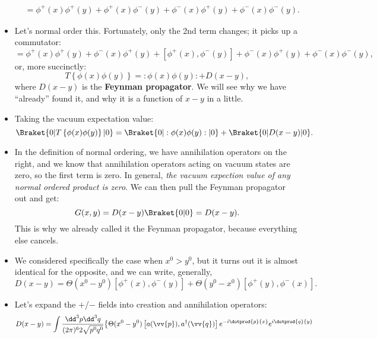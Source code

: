 \begin{itemize}
\begin{align*}
            &= \phi^+(x)\phi^+(y) + \phi^+(x)\phi^-(y) + \phi^-(x)\phi^+(y) + \phi^-(x)\phi^-(y).
        \end{align*}
    \item Let's normal order this. Fortunately, only the 2nd term changes; it picks up a commutator:
        \begin{equation*}
            = \phi^+(x)\phi^+(y) + \phi^-(x)\phi^+(y) + \left[ \phi^+(x),\phi^-(y) \right] + \phi^-(x)\phi^+(y) + \phi^-(x)\phi^-(y),
        \end{equation*}
        or, more succinctly:
        \begin{equation*}
            T\left\{ \phi(x)\phi(y) \right\} = :\phi(x)\phi(y): + D(x-y),
        \end{equation*}
        where $D(x-y)$ is the \textbf{Feynman propagator}. We will see why we have ``already'' found it, and why it is a function of $x-y$ in a little.
    \item Taking the vacuum expectation value:
        \begin{equation*}
            \Braket{0 | T\left\{ \phi(x)\phi(y) \right\} | 0} = \Braket{0 | :\phi(x)\phi(y): | 0} + \Braket{0 | D(x-y) | 0}.
        \end{equation*}
    \item In the definition of normal ordering, we have annihilation operators on the right, and we know that annihilation operators acting on vacuum states are zero, so the first term is zero. In general, \textit{the vacuum expection value of any normal ordered product is zero}. We can then pull the Feynman propagator out and get:
        \begin{equation*}
            G(x,y) = D(x-y)\Braket{0 | 0} = D(x-y).
        \end{equation*}
        This is why we already called it the Feynman propagator, because everything else cancels.
    \item We considered specifically the case when $x^0 > y^0$, but it turns out it is almost identical for the opposite, and we can write, generally,
        \begin{equation*}
            D(x-y) = \Theta(x^0 - y^0)\left[ \phi^+(x),\phi^-(y) \right] + \Theta(y^0 - x^0)\left[ \phi^+(y),\phi^-(x) \right].
        \end{equation*}
    \item Let's expand the $+$/$-$ fields into creation and annihilation operators:
        \begin{multline*}
            D(x-y) = \int \frac{\dd^3p \dd^3q}{(2\pi)^6 2\sqrt{p^0q^0}} \big\{ \Theta(x^0 - y^0)\left[ a(\vv{p}),a^{\dagger}(\vv{q}) \right]e^{-i\dotprod{p}{x}}e^{i\dotprod{q}{y}} \\

\end{multline*}
\end{itemize}
